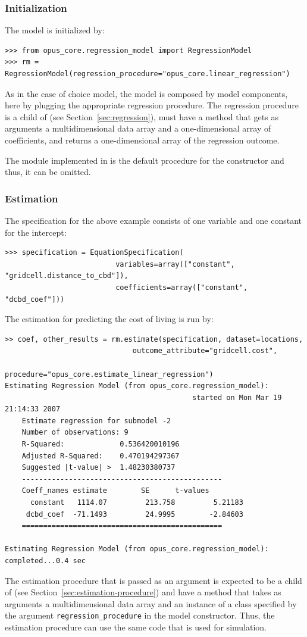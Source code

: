 %
\subsubsection{Initialization}
%
The model is initialized by:
\begin{verbatim}
>>> from opus_core.regression_model import RegressionModel
>>> rm = RegressionModel(regression_procedure="opus_core.linear_regression")
\end{verbatim}
As in the case of choice model, the model is composed by model components, here
by plugging the appropriate regression procedure. The
regression procedure is a child of  (see Section~\ref{sec:regression}),
must have a method  that gets as arguments a
multidimensional data array and a one-dimensional array of coefficients, \coefficientsindex and
returns a one-dimensional array of the regression outcome.

The  module implemented in  is the default
procedure for the  constructor and thus, it can be omitted.

%
\subsubsection{Estimation}
%
The specification for the above example consists of one variable \variablesindex and one
constant for the intercept:
\variablesindex
\begin{verbatim}
>>> specification = EquationSpecification(
                          variables=array(["constant", "gridcell.distance_to_cbd"]),
                          coefficients=array(["constant", "dcbd_coef"]))
\end{verbatim}
The estimation for predicting the cost of living is run by:
\begin{verbatim}
>> coef, other_results = rm.estimate(specification, dataset=locations,
                              outcome_attribute="gridcell.cost",
                              procedure="opus_core.estimate_linear_regression")
Estimating Regression Model (from opus_core.regression_model):
                                            started on Mon Mar 19 21:14:33 2007
    Estimate regression for submodel -2
    Number of observations: 9
    R-Squared:             0.536420010196
    Adjusted R-Squared:    0.470194297367
    Suggested |t-value| >  1.48230380737
    -----------------------------------------------
    Coeff_names estimate        SE      t-values
      constant   1114.07         213.758         5.21183
     dcbd_coef  -71.1493         24.9995        -2.84603
    ===============================================

Estimating Regression Model (from opus_core.regression_model): completed...0.4 sec
\end{verbatim}
The estimation procedure that is passed as an argument is expected to be
a child of  (see Section~\ref{sec:estimation-procedure}) and have a
method  that takes as arguments a
multidimensional data array and an instance of a class specified by the
argument \verb|regression_procedure| in the model constructor. Thus, the
estimation procedure can use the same code that is used for simulation.

